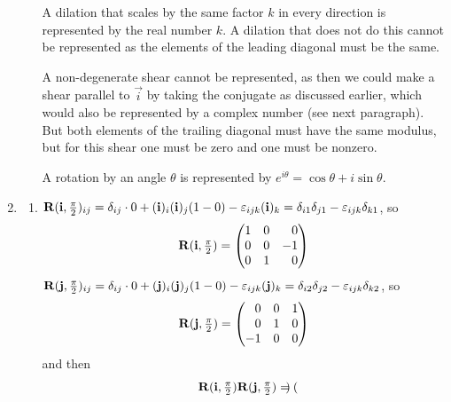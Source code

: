 \documentclass[fleqn,a4paper,11pt]{article}
\begin{document}
\begin{enumerate}[label=\textbf{\arabic*.}]
\begin{enumerate}[label=(\alph*)]
      A dilation that scales by the same factor \(k\) in every direction is
      represented by the real number \(k\). A dilation that does not do this
      cannot be represented as the elements of the leading diagonal must be the
      same.

      A non-degenerate shear cannot be represented,
      as then we could make a shear parallel to \(\vec i\) by taking the
      conjugate as discussed earlier, which would also be
      represented by a complex number (see next paragraph).
      But both elements of the trailing diagonal must have the same modulus, but
      for this shear one must be zero and one must be nonzero.

      A rotation by an angle \(\theta\) is represented by
      \(e^{i\theta} = \cos \theta + i \sin \theta\).
    \end{enumerate}
   \item
    \begin{enumerate}[label=(\alph*)]
     \item
      \(\mathbf{R}(\mathrm{\mathbf{i}}, \frac \pi 2)_{ij}
        = \delta_{ij} \cdot 0 + (\mathrm{\mathbf{i}})_i (\mathrm{\mathbf{i}})_j (1 - 0)
           - \varepsilon_{ijk} (\mathrm{\mathbf{i}})_k
        = \delta_{i1} \delta_{j1} - \varepsilon_{ijk} \delta_{k1}\), so
      \begin{equation*}
       \mat R(\vec i, \tfrac \pi 2)
        =
        \begin{pmatrix*}[r]
         1 & 0 & 0 \\
         0 & 0 & -1 \\
         0 & 1 & 0
        \end{pmatrix*}
      \end{equation*}
      \(\mathbf{R}(\mathrm{\mathbf{j}}, \frac \pi 2)_{ij}
        = \delta_{ij} \cdot 0 + (\mathrm{\mathbf{j}})_i (\mathrm{\mathbf{j}})_j (1 - 0)
           - \varepsilon_{ijk} (\mathrm{\mathbf{j}})_k
        = \delta_{i2} \delta_{j2} - \varepsilon_{ijk} \delta_{k2}\), so
      \begin{equation*}
       \mat R(\vec j, \tfrac \pi 2)
        =
        \begin{pmatrix*}[r]
         0 & 0 & 1 \\
         0 & 1 & 0 \\
         -1 & 0 & 0
        \end{pmatrix*}
      \end{equation*}
      and then
      \begin{equation*}
       \mat R(\vec i, \tfrac \pi 2)\mat R(\vec j, \tfrac \pi 2)
        =
        \begin{pmatrix*}[r]

\end{pmatrix*}
\end{equation*}
\end{enumerate}
\end{enumerate}
\end{document}
